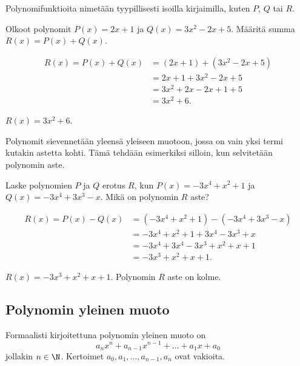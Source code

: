 Polynomifunktioita nimetään tyypillisesti isoilla kirjaimilla, kuten $P$, $Q$ tai $R$.

\begin{esimerkki}
    Olkoot polynomit $P(x)=2x+1$ ja $Q(x)=3x^2-2x+5$. Määritä summa $R(x)=P(x)+Q(x)$.
    \begin{esimratk}
        \begin{align*}
            R(x) = P(x)+Q(x) &= (2x+1)+(3x^2-2x+5) \\
                             &= 2x+1+3x^2-2x+5 \\
                             &= 3x^2+2x-2x+1+5 \\
                             &= 3x^2+6.
        \end{align*}
    \end{esimratk}
    \begin{esimvast}
        $R(x) = 3x^2+6$.
    \end{esimvast}
\end{esimerkki}

Polynomit sievennetään yleensä yleiseen muotoon, jossa on vain yksi termi kutakin astetta kohti.
Tämä tehdään esimerkiksi silloin, kun selvitetään polynomin aste.

\begin{esimerkki}
    Laske polynomien $P$ ja $Q$ erotus $R$, kun $P(x)=-3x^4+x^2+1$ ja $Q(x)=-3x^4+3x^3-x$.
    Mikä on polynomin $R$ aste?
   \begin{esimratk}
        \begin{align*}
            R(x) = P(x)-Q(x) &= (-3x^4+x^2+1)-(-3x^4+3x^3-x) \\
                             &= -3x^4+x^2+1+3x^4-3x^3+x \\
                             &= -3x^4+3x^4-3x^3+x^2+x+1 \\
                             &= -3x^3+x^2+x+1.
        \end{align*}
    \end{esimratk}
    \begin{esimvast}
        $R(x) = -3x^3+x^2+x+1$. Polynomin $R$ aste on kolme.
    \end{esimvast}
\end{esimerkki}

\subsection{Polynomin yleinen muoto}

Formaalisti kirjoitettuna polynomin yleinen muoto on
\[
a_n x^n + a_{n-1} x^{n-1} + \ldots + a_1 x + a_0 \] 
jollakin $n\in\N$. Kertoimet $a_0, a_1, \ldots, a_{n-1}, a_n$ ovat vakioita.
 
